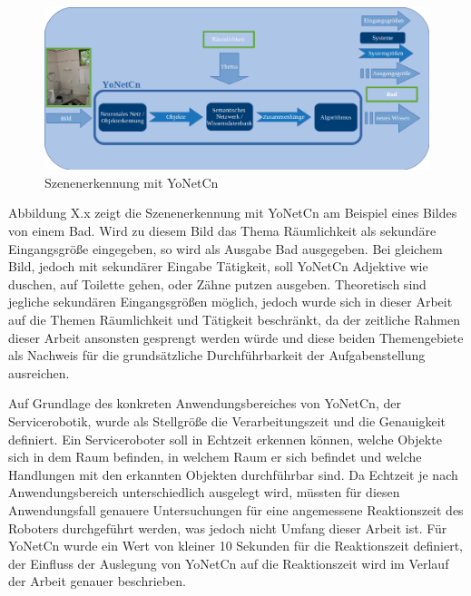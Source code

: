 \begin{figure}[h]
	
	\begin{center}
		
		\includegraphics[width=14cm]{images/Masteridee_2.png}
		
		\caption{Szenenerkennung mit YoNetCn}
		
		\label{system_Bild}
		
	\end{center}
	
	
\end{figure}


Abbildung X.x zeigt die Szenenerkennung mit YoNetCn am Beispiel eines Bildes von einem Bad. Wird zu diesem Bild das Thema Räumlichkeit als sekundäre Eingangsgröße eingegeben, so wird als Ausgabe Bad ausgegeben. Bei gleichem Bild, jedoch mit sekundärer Eingabe Tätigkeit, soll YoNetCn Adjektive wie duschen, auf Toilette gehen, oder Zähne putzen ausgeben. Theoretisch sind jegliche sekundären Eingangsgrößen möglich, jedoch wurde sich in dieser Arbeit auf die Themen Räumlichkeit und Tätigkeit beschränkt, da der zeitliche Rahmen dieser Arbeit ansonsten gesprengt werden würde und diese beiden Themengebiete als Nachweis für die grundsätzliche Durchführbarkeit der Aufgabenstellung ausreichen. 


Auf Grundlage des konkreten Anwendungsbereiches von YoNetCn, der Servicerobotik, wurde als Stellgröße die Verarbeitungszeit und die Genauigkeit definiert. Ein Serviceroboter soll in Echtzeit erkennen können, welche Objekte sich in dem  Raum befinden, in welchem Raum er sich befindet und welche Handlungen mit den erkannten Objekten durchführbar sind. Da Echtzeit je nach Anwendungsbereich unterschiedlich ausgelegt wird, müssten für diesen Anwendungsfall genauere Untersuchungen für eine angemessene Reaktionszeit des Roboters durchgeführt werden, was jedoch nicht Umfang dieser Arbeit ist. Für YoNetCn wurde ein Wert von kleiner 10 Sekunden für die Reaktionszeit definiert, der Einfluss der Auslegung von YoNetCn auf die Reaktionszeit wird im Verlauf der Arbeit genauer beschrieben. 

